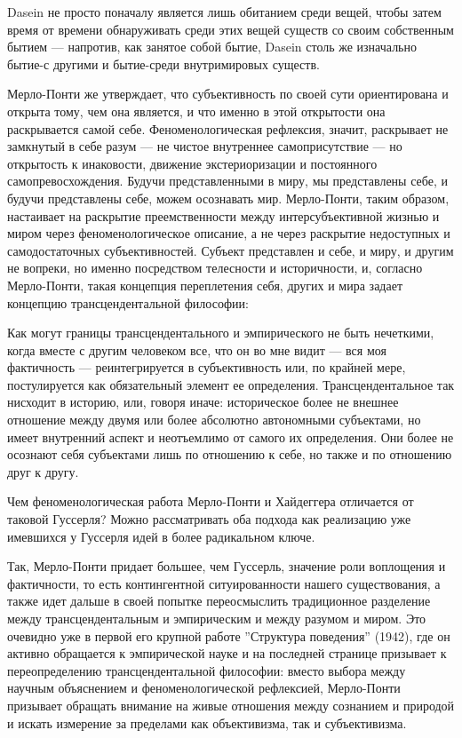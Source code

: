 \documentclass[11pt]{book}
\begin{document}
Dasein не просто поначалу является лишь обитанием среди вещей, чтобы затем время от времени обнаруживать среди этих вещей существ со своим собственным бытием
 --- напротив, как занятое собой бытие, Dasein столь же изначально бытие-с другими и бытие-среди внутримировых существ.

\relax
{}\relax
\smallskip

Мерло-Понти же утверждает, что субъективность по своей сути ориентирована и открыта тому, чем она является, и что именно в этой открытости она раскрывается самой себе. Феноменологическая рефлексия, значит, раскрывает не замкнутый в себе разум --- не чистое внутреннее самоприсутствие --- но открытость к инаковости, движение экстериоризации и постоянного самопревосхождения. Будучи представленными в миру, мы представлены себе, и будучи представлены себе, можем осознавать мир. Мерло-Понти, таким образом, настаивает на раскрытие преемственности между интерсубъективной жизнью и миром через феноменологическое описание, а не через раскрытие недоступных и самодостаточных субъективностей. Субъект представлен и себе, и миру, и другим не вопреки, но именно посредством телесности и историчности, и, согласно Мерло-Понти, такая концепция переплетения себя, других и мира задает концепцию трансцендентальной философии:

\smallskip
{}\relax
{}\relax

Как могут границы трансцендентального и эмпирического не быть нечеткими, когда вместе с другим человеком все, что он во мне видит --- вся моя фактичность --- реинтегрируется в субъективность или, по крайней мере, постулируется как обязательный элемент ее определения. Трансцендентальное так нисходит в историю, или, говоря иначе: историческое более не внешнее отношение между двумя или более абсолютно автономными субъектами, но имеет внутренний аспект и неотъемлимо от самого их определения. Они более не осознают себя субъектами лишь по отношению к себе, но также и по отношению друг к другу.

\relax
{}\relax
\smallskip

Чем феноменологическая работа Мерло-Понти и Хайдеггера отличается от таковой Гуссерля? Можно рассматривать оба подхода как реализацию уже имевшихся у Гуссерля идей в более радикальном ключе.

Так, Мерло-Понти придает большее, чем Гуссерль, значение роли воплощения и фактичности, то есть контингентной ситуированности нашего существования, а также идет дальше в своей попытке переосмыслить традиционное разделение между трансцендентальным и эмпирическим и между разумом и миром. Это очевидно уже в первой его крупной работе ''Структура поведения'' (1942), где он активно обращается к эмпирической науке и на последней странице призывает к переопределению трансцендентальной философии: вместо выбора между научным объяснением и феноменологической рефлексией, Мерло-Понти призывает обращать внимание на живые отношения между сознанием и природой и искать измерение за пределами как объективизма, так и субъективизма.
\end{document}
